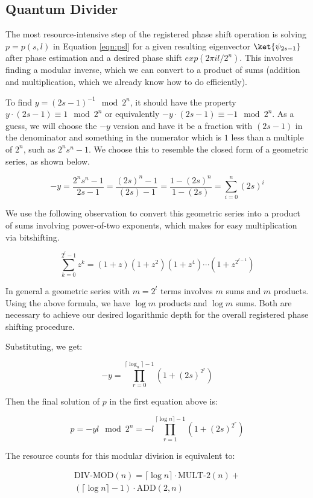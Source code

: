 \subsection{Quantum Divider}
\label{subsec:div}

The most resource-intensive step of the registered phase shift operation
is solving $p = p(s,l)$ in Equation
\ref{eqn:psl} for a given resulting
eigenvector $\ket{\psi_{2s-1}}$ after phase estimation and a desired
phase shift $exp(2\pi i l / 2^n)$.
This involves finding a modular inverse, which
we can convert to a product of sums (addition and multiplication,
which we already know how to do efficiently).

To find $y = (2s-1)^{-1} \mod 2^n$, it should have the property
$y \cdot (2s-1) \equiv 1 \mod 2^n$ or equivalently
$-y \cdot (2s-1) \equiv -1 \mod 2^n$. As a guess, we will choose the
$-y$ version and have it be a fraction with $(2s-1)$ in the denominator and
something in the numerator which is $1$ less than a multiple of
$2^n$, such as $2^n s^n - 1$.
We choose this to resemble the closed form of a geometric series,
as shown below.

\begin{displaymath}
-y = \frac{2^n s^n - 1}{2s - 1} = \frac{(2s)^n - 1}{(2s) - 1} =
\frac{1 - (2s)^n}{1 - (2s)} = \sum_{i=0}^n (2s)^i
\end{displaymath}

We use the following observation to convert this geometric series into a
product of sums involving power-of-two exponents, which makes for 
easy multiplication via bitshifting.

\begin{displaymath}
\sum_{k=0}^{2^l - 1} z^k = (1 + z)(1 + z^2)(1 + z^4)\cdots(1 + z^{2^{l-1}})
\end{displaymath}

In general a geometric series with $m = 2^l$ terms
involves $m$ sums
and $m$ products. Using the above formula, we have $\log m$ products and
$\log m$ sums. Both are necessary to achieve our desired logarithmic
depth for the overall registered phase shifting procedure.

Substituting, we get:

\begin{displaymath}
-y = \prod_{r=0}^{\lceil \log_n \rceil - 1} (1 + (2s)^{2^r})
\end{displaymath}

Then the final solution of $p$ in the first equation above is:

\begin{displaymath}
p = -yl \mod 2^n = -l \prod_{r=1}^{\lceil \log n \rceil -1} (1 + (2s)^{2^r})
\end{displaymath}

The resource counts for this modular division is equivalent to:

\begin{multline}
\text{DIV-MOD}(n) = \lceil \log n \rceil \cdot \text{MULT-2}(n) + \\
 (\lceil \log n \rceil - 1) \cdot \text{ADD}(2, n)
\end{multline}